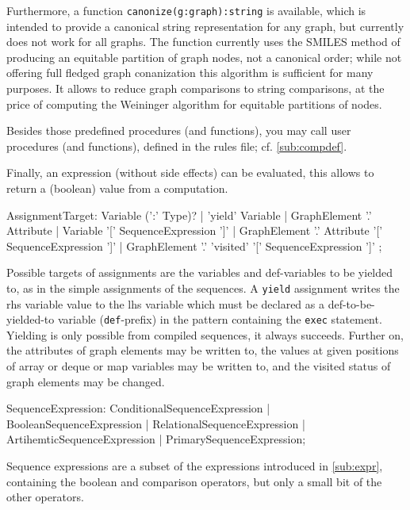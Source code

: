 Furthermore, a function \texttt{canonize(g:graph):string} is available,
which is intended to provide a canonical string representation for any graph, but currently does not work for all graphs.
The function currently uses the SMILES\cite{SMILES} method of producing an equitable partition of graph nodes, not a canonical order; while not offering full fledged graph conanization this algorithm is sufficient for many purposes. 
It allows to reduce graph comparisons to string comparisons, at the price of computing the Weininger algorithm for equitable partitions of nodes.

Besides those predefined procedures (and functions), you may call user procedures (and functions), defined in the rules file; cf. \ref{sub:compdef}.

Finally, an expression (without side effects) can be evaluated, this allows to return a (boolean) value from a computation.

\begin{rail}
  AssignmentTarget: 
    Variable (':' Type)? |
    'yield' Variable |
    GraphElement '.' Attribute |
    Variable '[' SequenceExpression ']' |
    GraphElement '.' Attribute '[' SequenceExpression ']' |
    GraphElement '.' 'visited' '[' SequenceExpression ']'
;
\end{rail}

Possible targets of assignments are the variables and def-variables to be yielded to, as in the simple assignments of the sequences. 
A \texttt{yield} assignment writes the rhs variable value to the lhs variable which must be declared as a  def-to-be-yielded-to variable (\texttt{def}-prefix) in the pattern containing the \texttt{exec} statement.
Yielding is only possible from compiled sequences, it always succeeds.
Further on, the attributes of graph elements may be written to, the values at given positions of array or deque or map variables may be written to, and the visited status of graph elements may be changed.

\begin{rail}
  SequenceExpression:  
    ConditionalSequenceExpression |
    BooleanSequenceExpression |
    RelationalSequenceExpression |
    ArtihemticSequenceExpression |
    PrimarySequenceExpression;
\end{rail}

Sequence expressions are a subset of the expressions introduced in \ref{sub:expr}, containing the boolean and comparison operators, but only a small bit of the other operators.

